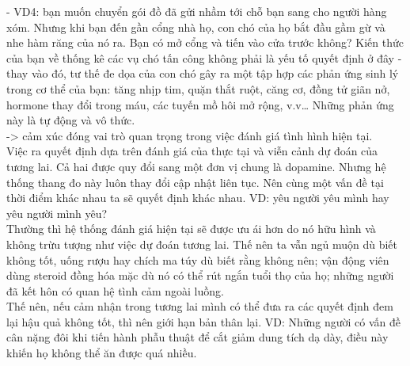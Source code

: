 \documentclass{article}
\newcommand\tab[1][1cm]{\hspace*{#1}}
\begin{document}
\tab - VD4:  bạn muốn chuyển gói đồ đã gửi nhầm tới chỗ
bạn sang cho người hàng xóm. Nhưng khi bạn đến gần cổng nhà họ, con
chó của họ bắt đầu gầm gừ và nhe hàm răng của nó ra. Bạn có mở cổng và
tiến vào cửa trước không? Kiến thức của bạn về thống kê các vụ chó tấn
công không phải là yếu tố quyết định ở đây - thay vào đó, tư thế đe dọa của
con chó gây ra một tập hợp các phản ứng sinh lý trong cơ thể của bạn: tăng
nhịp tim, quặn thắt ruột, căng cơ, đồng tử giãn nở, hormone thay đổi trong
máu, các tuyến mồ hôi mở rộng, v.v… Những phản ứng này là tự động và
vô thức.\\
\tab -> cảm xúc đóng vai trò quan trọng trong việc đánh giá tình hình hiện tại.\\
\tab Việc ra quyết định dựa trên đánh giá của thực tại và viễn cảnh dự đoán của tương lai. Cả hai được quy đổi
sang một đơn vị chung là dopamine. Nhưng hệ thống thang đo này luôn thay đổi cập nhật liên tục. Nên cùng một vấn
đề tại thời điểm khác nhau ta sẽ quyết định khác nhau. VD: yêu người yêu mình hay yêu người mình yêu?\\
\tab Thường thì hệ thống đánh giá hiện tại sẽ được ưu ái hơn do nó hữu hình và không trừu tượng như việc dự đoán
tương lai. Thế nên ta vẫn ngủ muộn dù biết không tốt, uống rượu hay chích ma túy dù biết rằng không
nên; vận động viên dùng steroid đồng hóa mặc dù nó có thể rút ngắn tuổi
thọ của họ; những người đã kết hôn có quan hệ tình cảm ngoài luồng.\\
\tab Thế nên, nếu cảm nhận trong tương lai mình có thể đưa ra các quyết định đem lại hậu quả không tốt, thì nên giới
hạn bản thân lại. VD: Những người có vấn đề cân nặng đôi khi tiến hành phẫu thuật để cắt giảm dung
tích dạ dày, điều này khiến họ không thể ăn được quá nhiều.\\
\end{document}
